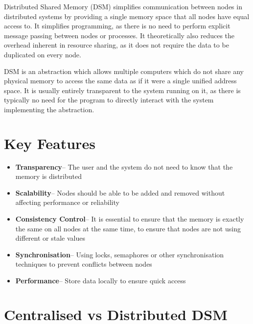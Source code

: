 
Distributed Shared Memory (DSM) simplifies communication between nodes in distributed systems by providing a single memory space that all nodes have equal access to. It simplifies programming, as there is no need to perform explicit message passing between nodes or processes. It theoretically also reduces the overhead inherent in resource sharing, as it does not require the data to be duplicated on every node.

DSM is an abstraction which allows multiple computers which do not share any physical memory to access the same data as if it were a single unified address space. It is usually entirely transparent to the system running on it, as there is typically no need for the program to directly interact with the system implementing the abstraction.

\section*{Key Features}

\begin{itemize}
  \item \textbf{Transparency}-- The user and the system do not need to know that the memory is distributed
  \item \textbf{Scalability}-- Nodes should be able to be added and removed without affecting performance or reliability
  \item \textbf{Consistency Control}-- It is essential to ensure that the memory is exactly the same on all nodes at the same time, to ensure that nodes are not using different or stale values
  \item \textbf{Synchronisation}-- Using locks, semaphores or other synchronisation techniques to prevent conflicts between nodes
  \item \textbf{Performance}-- Store data locally to ensure quick access
\end{itemize}

\section*{Centralised vs Distributed DSM}

